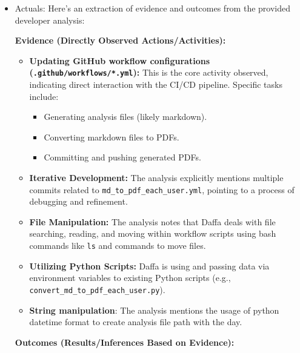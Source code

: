 \documentclass{article}
\begin{document}
\begin{itemize}
\begin{itemize}
        \item Actuals: Here's an extraction of evidence and outcomes from the provided developer analysis:

\textbf{Evidence (Directly Observed Actions/Activities):}

        \begin{itemize}
            \item \textbf{Updating GitHub workflow configurations (\texttt{.github/workflows/*.yml}):} This is the core activity observed, indicating direct interaction with the CI/CD pipeline.  Specific tasks include:
            \begin{itemize}
                \item Generating analysis files (likely markdown).
                \item Converting markdown files to PDFs.
                \item Committing and pushing generated PDFs.
            \end{itemize}
            \item \textbf{Iterative Development:} The analysis explicitly mentions multiple commits related to \texttt{md\_to\_pdf\_each\_user.yml}, pointing to a process of debugging and refinement.
            \item \textbf{File Manipulation:} The analysis notes that Daffa deals with file searching, reading, and moving within workflow scripts using bash commands like \texttt{ls} and commands to move files.
            \item \textbf{Utilizing Python Scripts:} Daffa is using and passing data via environment variables to existing Python scripts (e.g., \texttt{convert\_md\_to\_pdf\_each\_user.py}).
            \item \textbf{String manipulation}: The analysis mentions the usage of python datetime format to create analysis file path with the day.
        \end{itemize}

         \textbf{Outcomes (Results/Inferences Based on Evidence):}


\end{itemize}
\end{itemize}
\end{document}
